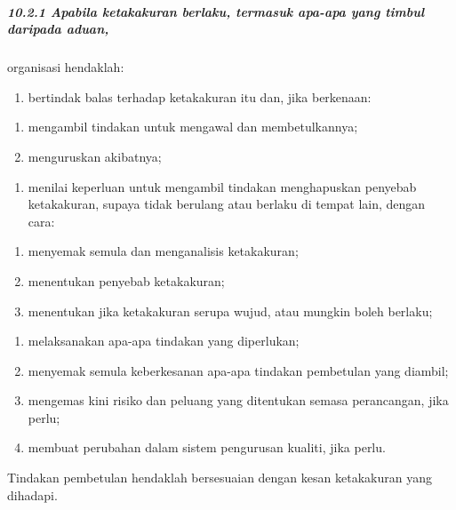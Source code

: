 \documentclass[
]{article}
\providecommand{\tightlist}{%
  \setlength{\itemsep}{0pt}\setlength{\parskip}{0pt}}
\begin{document}
\hypertarget{apabila-ketakakuran-berlaku-termasuk-apa-apa-yang-timbul-daripada-aduan}{%
\subparagraph{10.2.1 Apabila ketakakuran berlaku, termasuk apa-apa yang
timbul daripada
aduan,}\label{apabila-ketakakuran-berlaku-termasuk-apa-apa-yang-timbul-daripada-aduan}}

organisasi hendaklah:

\begin{enumerate}
\def\labelenumi{\alph{enumi})}
\tightlist
\item
  bertindak balas terhadap ketakakuran itu dan, jika berkenaan:
\end{enumerate}

\begin{enumerate}
\def\labelenumi{\arabic{enumi})}
\item
  mengambil tindakan untuk mengawal dan membetulkannya;
\item
  menguruskan akibatnya;
\end{enumerate}

\begin{enumerate}
\def\labelenumi{\alph{enumi})}
\setcounter{enumi}{1}
\tightlist
\item
  menilai keperluan untuk mengambil tindakan menghapuskan penyebab
  ketakakuran, supaya tidak berulang atau berlaku di tempat lain, dengan
  cara:
\end{enumerate}

\begin{enumerate}
\def\labelenumi{\arabic{enumi})}
\item
  menyemak semula dan menganalisis ketakakuran;
\item
  menentukan penyebab ketakakuran;
\item
  menentukan jika ketakakuran serupa wujud, atau mungkin boleh berlaku;
\end{enumerate}

\begin{enumerate}
\def\labelenumi{\alph{enumi})}
\setcounter{enumi}{2}
\item
  melaksanakan apa-apa tindakan yang diperlukan;
\item
  menyemak semula keberkesanan apa-apa tindakan pembetulan yang diambil;
\item
  mengemas kini risiko dan peluang yang ditentukan semasa perancangan,
  jika perlu;
\item
  membuat perubahan dalam sistem pengurusan kualiti, jika perlu.
\end{enumerate}

Tindakan pembetulan hendaklah bersesuaian dengan kesan ketakakuran yang
dihadapi.
\end{document}
